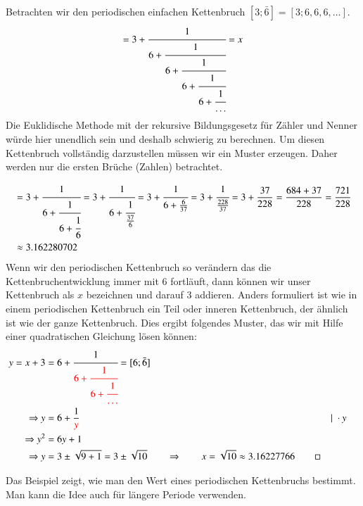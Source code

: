 \begin{beispiel}
Betrachten wir den periodischen einfachen Kettenbruch
$[3;\bar{6}] = [3;6,6,6,\dots]$.
\begin{equation}
[3;\bar{6}]
=
3 + \cfrac{1}{6+\cfrac{1}{6+\cfrac{1}{6+\cfrac{1}{6+\cfrac{1}{\dots}}}}}
=
x
\end{equation}
Die Euklidische Methode mit der rekursive Bildungsgesetz für Zähler
und Nenner würde hier unendlich sein und deshalb schwierig zu
berechnen.
Um diesen Kettenbruch vollständig darzustellen müssen wir ein Muster
erzeugen. Daher werden nur die ersten Brüche (Zahlen) betrachtet.

\begin{align*}
[3;6,6,6]
&=
3 + \cfrac{1}{6+\cfrac{1}{6+\cfrac{1}{6}}}
=
3 + \cfrac{1}{6+\cfrac{1}{\frac{37}{6}}}
=
3 + \cfrac{1}{6+\frac{6}{37}}
=
3 + \cfrac{1}{\frac{228}{37}}
=
3 + \frac{37}{228}
=
\frac{684+37}{228}
=
\frac{721}{228}
\\
&\approx
3.162280702
\end{align*}
Wenn wir den periodischen Kettenbruch so verändern das die Kettenbruchentwicklung 
immer mit 6 fortläuft, dann können wir unser Kettenbruch als $x$ bezeichnen 
und darauf 3 addieren. Anders formuliert ist wie in einem periodischen Kettenbruch 
ein {\color{red}Teil oder inneren Kettenbruch}, der ähnlich ist wie der ganze Kettenbruch. Dies ergibt 
folgendes Muster, das wir mit Hilfe einer quadratischen
Gleichung lösen können:
\begin{align*}
y = x+3 &= 6 + \cfrac{1}{\color{red}6+\cfrac{1}{6+\cfrac{1}{\dots}}} = [6;\bar{6}]
\\
\Rightarrow y &= 6 + \frac{1}{{\color{red}y}}	&&\vert\;\cdot y
\\
\Rightarrow y^2 &= 6y + 1
\\
\Rightarrow y &= 3\pm \sqrt{9+1} = 3 \pm \sqrt{10}\qquad\Rightarrow\qquad x = \sqrt{10}
\approx
3.16227766
\qedhere
\end{align*}
\end{beispiel}

Das Beispiel zeigt, wie man den Wert eines periodischen Kettenbruchs
bestimmt.
Man kann die Idee auch für längere Periode verwenden.

